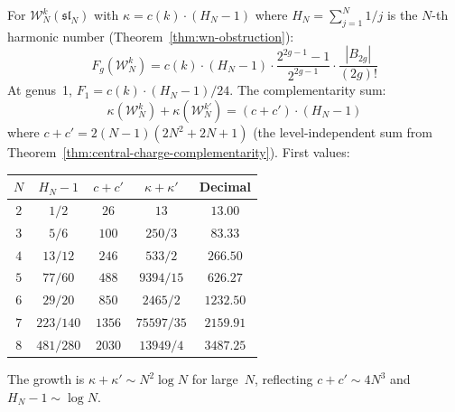 \begin{computation}\label{comp:wn-genus-expansion}
For $\mathcal{W}_N^k(\mathfrak{sl}_N)$ with $\kappa = c(k) \cdot (H_N - 1)$ where $H_N = \sum_{j=1}^N 1/j$ is the $N$-th harmonic number (Theorem~\ref{thm:wn-obstruction}):
\begin{equation}\label{eq:wn-Fg}
F_g(\mathcal{W}_N^k) = c(k) \cdot (H_N - 1) \cdot \frac{2^{2g-1}-1}{2^{2g-1}} \cdot \frac{|B_{2g}|}{(2g)!}
\end{equation}
At genus~1, $F_1 = c(k) \cdot (H_N - 1)/24$.  The complementarity sum:
\[
\kappa(\mathcal{W}_N^k) + \kappa(\mathcal{W}_N^{k'}) = (c + c') \cdot (H_N - 1)
\]
where $c + c' = 2(N-1)(2N^2+2N+1)$ (the level-independent sum from Theorem~\ref{thm:central-charge-complementarity}).  First values:
\begin{center}
\renewcommand{\arraystretch}{1.3}
\begin{tabular}{ccccc}
\toprule
$N$ & $H_N - 1$ & $c + c'$ & $\kappa + \kappa'$ & Decimal \\
\midrule
$2$ & $1/2$ & $26$ & $13$ & $13.00$ \\
$3$ & $5/6$ & $100$ & $250/3$ & $83.33$ \\
$4$ & $13/12$ & $246$ & $533/2$ & $266.50$ \\
$5$ & $77/60$ & $488$ & $9394/15$ & $626.27$ \\
$6$ & $29/20$ & $850$ & $2465/2$ & $1232.50$ \\
$7$ & $223/140$ & $1356$ & $75597/35$ & $2159.91$ \\
$8$ & $481/280$ & $2030$ & $13949/4$ & $3487.25$ \\
\bottomrule
\end{tabular}
\end{center}
The growth is $\kappa + \kappa' \sim N^2 \log N$ for large~$N$, reflecting $c + c' \sim 4N^3$ and $H_N - 1 \sim \log N$.
\end{computation}

